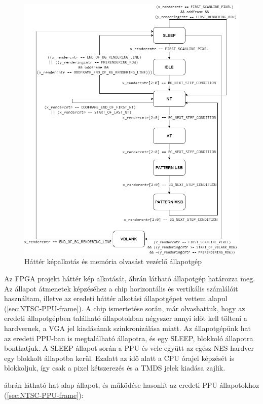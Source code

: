 	\begin{figure}[H]
		\centering
		\includegraphics[width=150mm, keepaspectratio]{figures/bg-rendering-FSM}
		\caption{Háttér képalkotás és memória olvasást vezérlő állapotgép} 
		\label{fig:bg-rendering-FSM}
	\end{figure} 
	
	Az FPGA projekt háttér kép alkotását,  ábrán látható állapotgép határozza meg. Az állapot átmenetek képzéséhez a chip horizontális és vertikális számlálóit használtam, illetve az eredeti háttér alkotási állapotgépet vettem alapul (\ref{sec:NTSC-PPU-frame}). A chip ismertetése során, már olvashattuk, hogy az eredeti állapotgépben található állapotokban négyszer annyi időt kell tölteni a hardvernek, a VGA jel kiadásának szinkronizálása miatt. Az állapotgépünk hat az eredeti PPU-ban is megtalálható állapotra, és egy SLEEP, blokkoló állapotra bonthatjuk. A SLEEP állapot során a PPU és vele együtt az egész NES hardver egy blokkolt állapotba kerül. Ezalatt az idő alatt a CPU órajel képzését is blokkoljuk, így csak a pixel kétszerezés és a TMDS jelek kiadása zajlik. 
	
	 ábrán látható hat alap állapot, és működése hasonlít az eredeti PPU állapotokhoz (\ref{sec:NTSC-PPU-frame}):
	
